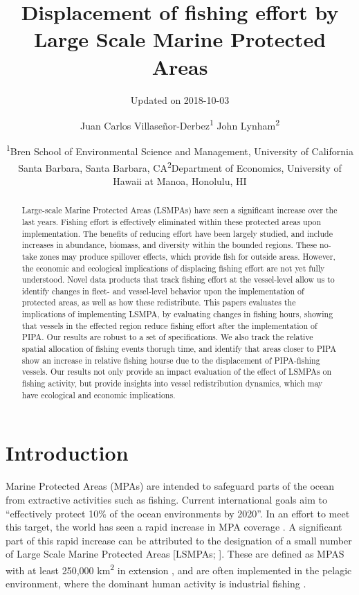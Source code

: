 \documentclass[12pt,]{article}
\title{Displacement of fishing effort by Large Scale Marine Protected Areas}
\subtitle{Updated on 2018-10-03}
\author{Juan Carlos Villaseñor-Derbez\textsuperscript{1} John
Lynham\textsuperscript{2}}
\date{\textsuperscript{1}Bren School of Environmental Science and Management,
University of California Santa Barbara, Santa Barbara,
CA\newline \textsuperscript{2}Department of Economics, University of
Hawaii at Manoa, Honolulu, HI}
\begin{document}
\maketitle
\begin{abstract}
Large-scale Marine Protected Areas (LSMPAs) have seen a significant
increase over the last years. Fishing effort is effectively eliminated
within these protected areas upon implementation. The benefits of
reducing effort have been largely studied, and include increases in
abundance, biomass, and diversity within the bounded regions. These
no-take zones may produce spillover effects, which provide fish for
outside areas. However, the economic and ecological implications of
displacing fishing effort are not yet fully understood. Novel data
products that track fishing effort at the vessel-level allow us to
identify changes in fleet- and vessel-level behavior upon the
implementation of protected areas, as well as how these redistribute.
This papers evaluates the implications of implementing LSMPA, by
evaluating changes in fishing hours, showing that vessels in the
effected region reduce fishing effort after the implementation of PIPA.
Our results are robust to a set of specifications. We also track the
relative spatial allocation of fishing events thorugh time, and identify
that areas closer to PIPA show an increase in relative fishing hourse
due to the displacement of PIPA-fishing vessels. Our results not only
provide an impact evaluation of the effect of LSMPAs on fishing
activity, but provide insights into vessel redistribution dynamics,
which may have ecological and economic implications.
\end{abstract}

\hypertarget{introduction}{%
\section{Introduction}\label{introduction}}

Marine Protected Areas (MPAs) are intended to safeguard parts of the
ocean from extractive activities such as fishing. Current international
goals aim to ``effectively protect 10\% of the ocean environments by
2020''. In an effort to meet this target, the world has seen a rapid
increase in MPA coverage \citep{wood_2008,sala_2018b}. A significant
part of this rapid increase can be attributed to the designation of a
small number of Large Scale Marine Protected Areas {[}LSMPAs;
\citep{gray_2017}{]}. These are defined as MPAS with at least 250,000
km\textsuperscript{2} in extension \citep{toonen_2013}, and are often
implemented in the pelagic environment, where the dominant human
activity is industrial fishing \citep{gray_2017}.
\end{document}
